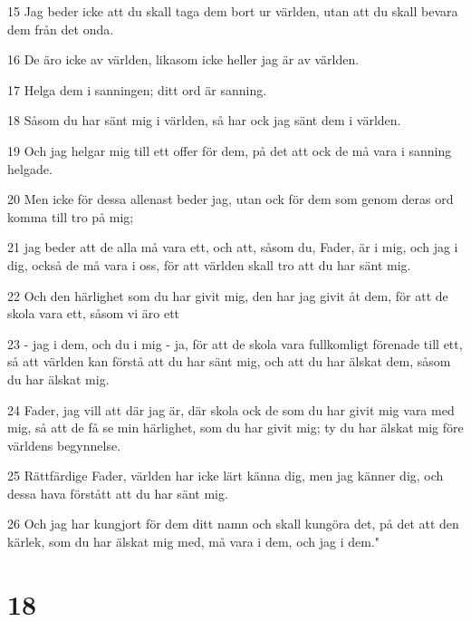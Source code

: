 \par 15 Jag beder icke att du skall taga dem bort ur världen, utan att du skall bevara dem från det onda.
\par 16 De äro icke av världen, likasom icke heller jag är av världen.
\par 17 Helga dem i sanningen; ditt ord är sanning.
\par 18 Såsom du har sänt mig i världen, så har ock jag sänt dem i världen.
\par 19 Och jag helgar mig till ett offer för dem, på det att ock de må vara i sanning helgade.
\par 20 Men icke för dessa allenast beder jag, utan ock för dem som genom deras ord komma till tro på mig;
\par 21 jag beder att de alla må vara ett, och att, såsom du, Fader, är i mig, och jag i dig, också de må vara i oss, för att världen skall tro att du har sänt mig.
\par 22 Och den härlighet som du har givit mig, den har jag givit åt dem, för att de skola vara ett, såsom vi äro ett
\par 23 - jag i dem, och du i mig - ja, för att de skola vara fullkomligt förenade till ett, så att världen kan förstå att du har sänt mig, och att du har älskat dem, såsom du har älskat mig.
\par 24 Fader, jag vill att där jag är, där skola ock de som du har givit mig vara med mig, så att de få se min härlighet, som du har givit mig; ty du har älskat mig före världens begynnelse.
\par 25 Rättfärdige Fader, världen har icke lärt känna dig, men jag känner dig, och dessa hava förstått att du har sänt mig.
\par 26 Och jag har kungjort för dem ditt namn och skall kungöra det, på det att den kärlek, som du har älskat mig med, må vara i dem, och jag i dem."

\chapter{18}

